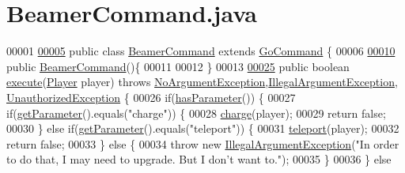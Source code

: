 \hypertarget{BeamerCommand_8java_source}{\section{Beamer\-Command.\-java}
}

\begin{DoxyCode}
00001 
\hypertarget{BeamerCommand_8java_source_l00005}{}\hyperlink{classBeamerCommand}{00005} \textcolor{keyword}{public} \textcolor{keyword}{class }\hyperlink{classBeamerCommand}{BeamerCommand} \textcolor{keyword}{extends} \hyperlink{classGoCommand}{GoCommand} \{
00006 
\hypertarget{BeamerCommand_8java_source_l00010}{}\hyperlink{classBeamerCommand_accb1d84a69588f1b42fba96bf1b32de5}{00010}     \textcolor{keyword}{public} \hyperlink{classBeamerCommand_accb1d84a69588f1b42fba96bf1b32de5}{BeamerCommand}()\{
00011 
00012     \}
00013 
\hypertarget{BeamerCommand_8java_source_l00025}{}\hyperlink{classBeamerCommand_ab28a7d743569841e463b2c0c65cf6eb1}{00025}     \textcolor{keyword}{public} \textcolor{keywordtype}{boolean} \hyperlink{classBeamerCommand_ab28a7d743569841e463b2c0c65cf6eb1}{execute}(\hyperlink{classPlayer}{Player} player) \textcolor{keywordflow}{throws} 
      \hyperlink{classNoArgumentException}{NoArgumentException},\hyperlink{classIllegalArgumentException}{IllegalArgumentException},
      \hyperlink{classUnauthorizedException}{UnauthorizedException} \{
00026         \textcolor{keywordflow}{if}(\hyperlink{classCommand_a9b042558156d6749566e0fd9d48d3bfe}{hasParameter}()) \{
00027             \textcolor{keywordflow}{if}(\hyperlink{classCommand_a1ced3739d546770ba1389e6ce228255e}{getParameter}().equals(\textcolor{stringliteral}{"charge"})) \{
00028                 \hyperlink{classBeamerCommand_a130a572b2ec0532c92ea5033a098b1ac}{charge}(player);
00029                 \textcolor{keywordflow}{return} \textcolor{keyword}{false};
00030             \} \textcolor{keywordflow}{else} \textcolor{keywordflow}{if}(\hyperlink{classCommand_a1ced3739d546770ba1389e6ce228255e}{getParameter}().equals(\textcolor{stringliteral}{"teleport"})) \{
00031                 \hyperlink{classBeamerCommand_a1f19366fb8b873959f72f38d49d5b178}{teleport}(player);
00032                 \textcolor{keywordflow}{return} \textcolor{keyword}{false};
00033             \} \textcolor{keywordflow}{else} \{
00034                 \textcolor{keywordflow}{throw} \textcolor{keyword}{new} \hyperlink{classIllegalArgumentException}{IllegalArgumentException}(\textcolor{stringliteral}{"In order to do that, I may need
       to upgrade. But I don't want to."});
00035             \}
00036         \} \textcolor{keywordflow}{else} 

\end{DoxyCode}

